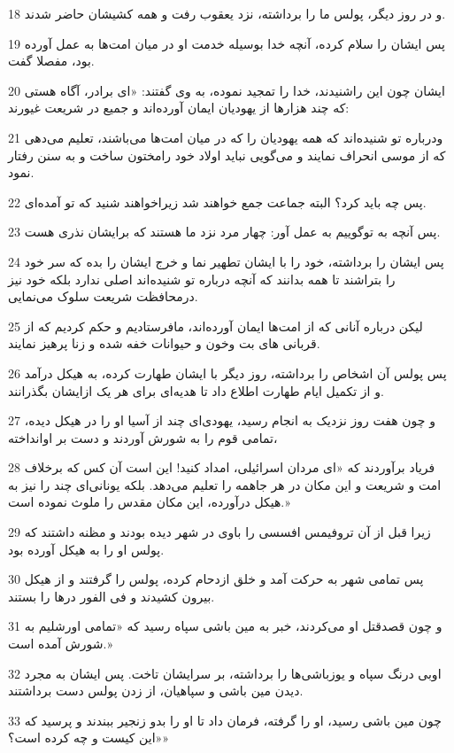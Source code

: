 \par 18 و در روز دیگر، پولس ما را برداشته، نزد یعقوب رفت و همه کشیشان حاضر شدند.
\par 19 پس ایشان را سلام کرده، آنچه خدا بوسیله خدمت او در میان امت‌ها به عمل آورده بود، مفصلا گفت.
\par 20 ایشان چون این راشنیدند، خدا را تمجید نموده، به وی گفتند: «ای برادر، آگاه هستی که چند هزارها از یهودیان ایمان آورده‌اند و جمیع در شریعت غیورند:
\par 21 ودرباره تو شنیده‌اند که همه یهودیان را که در میان امت‌ها می‌باشند، تعلیم می‌دهی که از موسی انحراف نمایند و می‌گویی نباید اولاد خود رامختون ساخت و به سنن رفتار نمود.
\par 22 پس چه باید کرد؟ البته جماعت جمع خواهند شد زیراخواهند شنید که تو آمده‌ای.
\par 23 پس آنچه به توگوییم به عمل آور: چهار مرد نزد ما هستند که برایشان نذری هست.
\par 24 پس ایشان را برداشته، خود را با ایشان تطهیر نما و خرج ایشان را بده که سر خود را بتراشند تا همه بدانند که آنچه درباره تو شنیده‌اند اصلی ندارد بلکه خود نیز درمحافظت شریعت سلوک می‌نمایی.
\par 25 لیکن درباره آنانی که از امت‌ها ایمان آورده‌اند، مافرستادیم و حکم کردیم که از قربانی های بت وخون و حیوانات خفه شده و زنا پرهیز نمایند.
\par 26 پس پولس آن اشخاص را برداشته، روز دیگر با ایشان طهارت کرده، به هیکل درآمد و از تکمیل ایام طهارت اطلاع داد تا هدیه‌ای برای هر یک ازایشان بگذرانند.
\par 27 و چون هفت روز نزدیک به انجام رسید، یهودی‌ای چند از آسیا او را در هیکل دیده، تمامی قوم را به شورش آوردند و دست بر اوانداخته،
\par 28 فریاد برآوردند که «ای مردان اسرائیلی، امداد کنید! این است آن کس که برخلاف امت و شریعت و این مکان در هر جاهمه را تعلیم می‌دهد. بلکه یونانی‌ای چند را نیز به هیکل درآورده، این مکان مقدس را ملوث نموده است.»
\par 29 زیرا قبل از آن تروفیمس افسسی را باوی در شهر دیده بودند و مظنه داشتند که پولس او را به هیکل آورده بود.
\par 30 پس تمامی شهر به حرکت آمد و خلق ازدحام کرده، پولس را گرفتند و از هیکل بیرون کشیدند و فی الفور درها را بستند.
\par 31 و چون قصدقتل او می‌کردند، خبر به مین باشی سپاه رسید که «تمامی اورشلیم به شورش آمده است.»
\par 32 اوبی درنگ سپاه و یوزباشی‌ها را برداشته، بر سرایشان تاخت. پس ایشان به مجرد دیدن مین باشی و سپاهیان، از زدن پولس دست برداشتند.
\par 33 چون مین باشی رسید، او را گرفته، فرمان داد تا او را بدو زنجیر ببندند و پرسید که «این کیست و چه کرده است؟»
